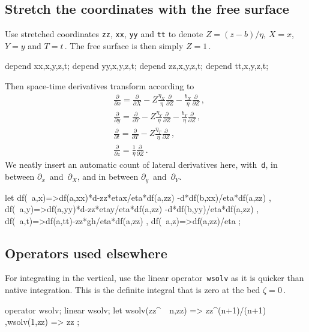 \documentclass[12pt,a5paper]{article}
\newcommand{\zs}{\zeta}
\begin{document}
\subsection{Stretch the coordinates with the free surface}

Use stretched coordinates \verb|zz|, \verb|xx|, \verb|yy| and \verb|tt| to denote
$Z=(z-b)/\eta$, $X=x$, $Y=y$ and $T=t$\,.  The free surface is then simply $Z=1$\,.

\begin{reduce}
depend xx,x,y,z,t;
depend yy,x,y,z,t;
depend zz,x,y,z,t;
depend tt,x,y,z,t;
\end{reduce}

Then space-time derivatives transform according to 
\begin{align}
    &\frac{\partial}{\partial x}=\frac{\partial}{\partial X}-Z\frac{\eta_X}\eta\frac{\partial}{\partial Z}-\frac{b_X}{\eta}\frac{\partial}{\partial Z}\,,\nonumber\\
    &\frac{\partial}{\partial y}=\frac{\partial}{\partial Y}-Z\frac{\eta_Y}\eta\frac{\partial}{\partial Z}-\frac{b_Y}{\eta}\frac{\partial}{\partial Z}\,,\nonumber\\
    &\frac{\partial}{\partial t}=\frac{\partial}{\partial T}-Z\frac{\eta_T}\eta\frac{\partial}{\partial Z}\,,\nonumber\\
    &\frac{\partial}{\partial z}=\frac{1}{\eta}\frac{\partial}{\partial Z}\,.
\end{align}
We neatly insert an automatic count of lateral derivatives
here, with~\verb|d|, in between $\partial_x$~and~$\partial_X$, and  in between $\partial_y$~and~$\partial_Y$.

\begin{reduce}
let{ df(~a,x)=>df(a,xx)*d-zz*etax/eta*df(a,zz)
              -d*df(b,xx)/eta*df(a,zz)
     , df(~a,y)=>df(a,yy)*d-zz*etay/eta*df(a,zz)
              -d*df(b,yy)/eta*df(a,zz)
     , df(~a,t)=>df(a,tt)-zz*gh/eta*df(a,zz)
     , df(~a,z)=>df(a,zz)/eta
     };
\end{reduce}


\subsection{Operators used elsewhere}

For integrating in the vertical, use the linear operator~\verb|wsolv| as it is quicker than native integration.  This is the definite integral that is zero at the bed $\zs=0$\,.

\begin{reduce}
operator wsolv; linear wsolv;
let {wsolv(zz^~~n,zz) => zz^(n+1)/(n+1)
    ,wsolv(1,zz) => zz };
\end{reduce}
\end{document}
